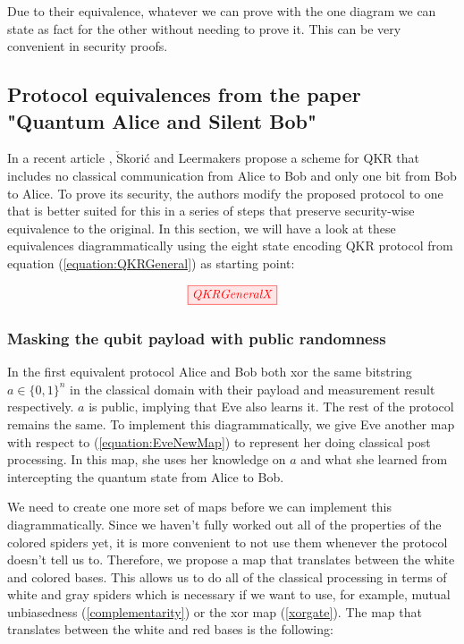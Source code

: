 \documentclass[]{article}
\begin{document}
Due to their equivalence, whatever we can prove with the one diagram we can state as fact for the other without needing to prove it. This can be very convenient in security proofs.

\subsection{Protocol equivalences from the paper "Quantum Alice and Silent Bob" \cite{cryptoeprint:2019:875}}

\label{section:QAaSBEequivalences}
In a recent article \cite{cryptoeprint:2019:875}, $\check{\textrm{S}}$korić and Leermakers propose a scheme for QKR that includes no classical communication from Alice to Bob and only one bit from Bob to Alice. To prove its security, the authors modify the proposed protocol to one that is better suited for this in a series of steps that preserve security-wise equivalence to the original. In this section, we will have a look at these equivalences diagrammatically using the eight state encoding QKR protocol from equation (\ref{equation:QKRGeneral}) as starting point:

\begin{equation}
\label{equation:QKRGeneral}
	\tikzfig{QKRGeneralX}
\end{equation}


\subsubsection{Masking the qubit payload with public randomness}
\label{section:maskingqubitpubrand}
In the first equivalent protocol Alice and Bob both xor the same bitstring $a \in \{0,1\}^n$ in the classical domain with their payload and measurement result respectively. $a$ is public, implying that Eve also learns it. The rest of the protocol remains the same. To implement this diagrammatically, we give Eve another map with respect to (\ref{equation:EveNewMap}) to represent her doing classical post processing. In this map, she uses her knowledge on $a$ and what she learned from intercepting the quantum state from Alice to Bob.

We need to create one more set of maps before we can implement this diagrammatically. Since we haven't fully worked out all of the properties of the colored spiders yet, it is more convenient to not use them whenever the protocol doesn't tell us to. Therefore, we propose a map that translates between the white and colored bases. This allows us to do all of the classical processing in terms of white and gray spiders which is necessary if we want to use, for example, mutual unbiasedness (\ref{complementarity}) or the xor map (\ref{xorgate}). The map that translates between the white and red bases is the following:
\end{document}
